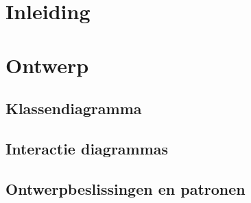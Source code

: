 \documentclass[i1]{oss}
\begin{document}

\maketitlepage
\newpage
\tableofcontents
\pagebreak



\section*{Inleiding}
\label{ssec:Inleiding}

\section{Ontwerp}
\label{ssec:Ontwerp}


\subsection{Klassendiagramma}
\label{ssec:Klassendiagramma}
\subsection{Interactie diagrammas}
\label{ssec:Interactiedia}

\subsection{Ontwerpbeslissingen en patronen}
\label{ssec:Ontwerpbeslissingen}

\end{document}
